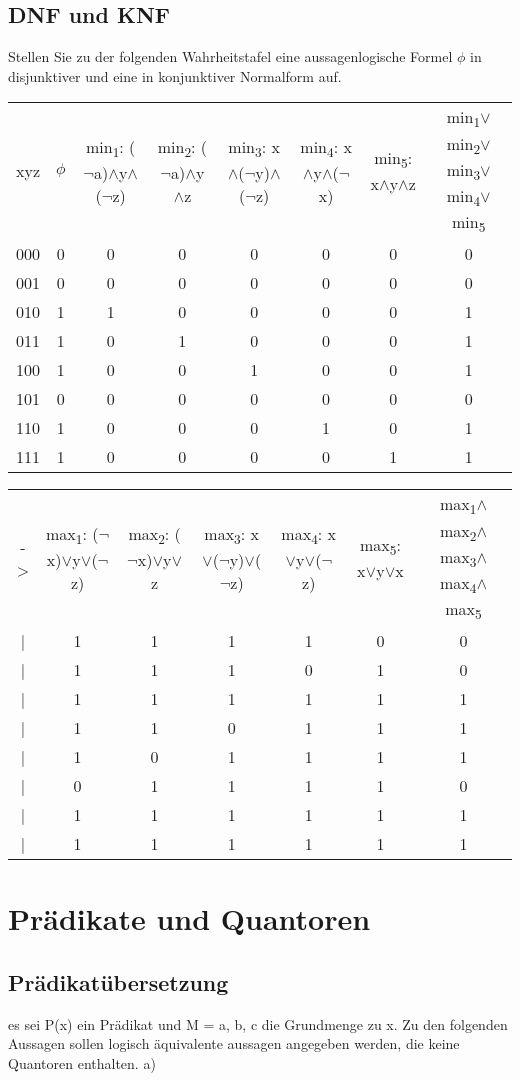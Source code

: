 \subsection{DNF und KNF}
Stellen Sie zu der folgenden Wahrheitstafel eine aussagenlogische Formel $\phi$ in
disjunktiver und eine in konjunktiver Normalform auf.\\
{
    \tiny
    \begin{tabular}{cccccccc}
        xyz & 
        $\phi$ & 
        min\textsubscript{1}: ($\neg$a)$\wedge$y$\wedge$($\neg$z) & 
        min\textsubscript{2}: ($\neg$a)$\wedge$y$\wedge$z & 
        min\textsubscript{3}: x$\wedge$($\neg$y)$\wedge$($\neg$z) & 
        min\textsubscript{4}: x$\wedge$y$\wedge$($\neg$x) & 
        min\textsubscript{5}: x$\wedge$y$\wedge$z & 
        min\textsubscript{1}$\vee$min\textsubscript{2}$\vee$min\textsubscript{3}$\vee$min\textsubscript{4}$\vee$min\textsubscript{5}\\
        000 & 0 & 0 & 0 & 0 & 0 & 0 & 0\\
        001 & 0 & 0 & 0 & 0 & 0 & 0 & 0\\
        010 & 1 & 1 & 0 & 0 & 0 & 0 & 1\\
        011 & 1 & 0 & 1 & 0 & 0 & 0 & 1\\
        100 & 1 & 0 & 0 & 1 & 0 & 0 & 1\\
        101 & 0 & 0 & 0 & 0 & 0 & 0 & 0\\
        110 & 1 & 0 & 0 & 0 & 1 & 0 & 1\\
        111 & 1 & 0 & 0 & 0 & 0 & 1 & 1
    \end{tabular}
    \begin{tabular}{ccccccc}
        ->&
        max\textsubscript{1}: ($\neg$x)$\vee$y$\vee$($\neg$z)&
        max\textsubscript{2}: ($\neg$x)$\vee$y$\vee$z&
        max\textsubscript{3}: x$\vee$($\neg$y)$\vee$($\neg$z)&
        max\textsubscript{4}: x$\vee$y$\vee$($\neg$z)&
        max\textsubscript{5}: x$\vee$y$\vee$x&
        max\textsubscript{1}$\wedge$max\textsubscript{2}$\wedge$max\textsubscript{3}$\wedge$max\textsubscript{4}$\wedge$max\textsubscript{5}\\
        | & 1 & 1 & 1 & 1 & 0 & 0 \\
        | & 1 & 1 & 1 & 0 & 1 & 0 \\
        | & 1 & 1 & 1 & 1 & 1 & 1 \\
        | & 1 & 1 & 0 & 1 & 1 & 1 \\
        | & 1 & 0 & 1 & 1 & 1 & 1 \\
        | & 0 & 1 & 1 & 1 & 1 & 0 \\
        | & 1 & 1 & 1 & 1 & 1 & 1 \\
        | & 1 & 1 & 1 & 1 & 1 & 1 
    \end{tabular}
}
\section{Prädikate und Quantoren}
\subsection{Prädikatübersetzung}
es sei P(x) ein Prädikat und M = {a, b, c} die Grundmenge zu x. Zu den folgenden
Aussagen sollen logisch äquivalente aussagen angegeben werden, die keine Quantoren
enthalten.
a) 